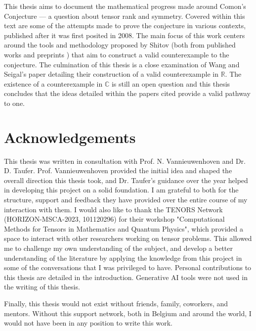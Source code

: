 \documentclass[12pt,a4paper,oneside]{book}
\def\reals{\mathbb{R}} %
\def\complex{\mathbb{C}} %
\theoremstyle{definition}
\begin{document}
This thesis aims to document the mathematical progress made around Comon's Conjecture --- a question about tensor rank and symmetry. Covered within this text are some of the attempts made to prove the conjecture in various contexts, published after it was first posited in 2008. The main focus of this work centers around the tools and methodology proposed by Shitov (both from published works \cite{shitov_counterexample_2018} and preprints \cites{shitov_comons_2020,shitov_higher_2024,shitov_higher_2024-1}) that aim to construct a valid counterexample to the conjecture. The culmination of this thesis is a close examination of Wang and Seigal's paper \cite{wang_lower_2023} detailing their construction of a valid counterexample in $\reals$. The existence of a counterexample in $\complex$ is still an open question and this thesis concludes that the ideas detailed within the papers cited  provide a valid pathway to one.

\section*{Acknowledgements}
This thesis was written in consultation with Prof. N. Vannieuwenhoven and Dr. D. Taufer. Prof. Vannieuwenhoven provided the initial idea and shaped the overall direction this thesis took, and Dr. Taufer's guidance over the year helped in developing this project on a solid foundation. I am grateful to both for the structure, support and feedback they have provided over the entire course of my interaction with them. I would also like to thank the TENORS Network (HORIZON-MSCA-2023, 101120296) for their workshop "Computational Methods for Tensors in Mathematics and Quantum Physics", which provided a space to interact with other researchers working on tensor problems. This allowed me to challenge my own understanding of the subject, and develop a better understanding of the literature by applying the knowledge from this project in some of the conversations that I was privileged to have.  Personal contributions to this thesis are detailed in the introduction. Generative AI tools were not used in the writing of this thesis.

Finally, this thesis would not exist without friends, family, coworkers, and mentors. Without this support network, both in Belgium and around the world, I would not have been in any position to write this work. 

\tableofcontents
\printnomenclature[4cm]
\cleardoublepage
{}
\listoffigures
\newpage
\setcounter{page}{0}
\end{document}
